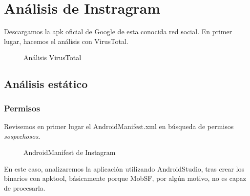 \documentclass[12pt,twoside]{article}
\begin{document}
\newpage
\section{Análisis de Instragram}
Descargamos la apk oficial de Google de esta conocida red social. 
En primer lugar, hacemos el análisis con VirusTotal.
\begin{figure}[H]
    \centering
    \caption{Análisis VirusTotal}
\end{figure}

\subsection{Análisis estático}
\subsubsection{Permisos}
Revisemos en primer lugar el AndroidManifest.xml en búsqueda de permisos \textit{sospechosos}. 
\begin{figure}[H]
    \centering
    \caption{AndroidManifest de Instagram}
\end{figure}
En este caso, analizaremos la aplicación utilizando AndroidStudio, tras crear los binarios con apktool, básicamente porque MobSF, por algún motivo, no es capaz de procesarla.
\end{document}

